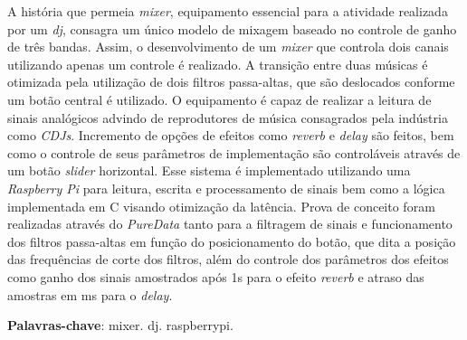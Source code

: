 \begin{resumo}
    A história que permeia \textit{mixer}, equipamento essencial para a atividade realizada por um \textit{dj}, consagra um único modelo de mixagem baseado no controle de ganho de três bandas. Assim, o desenvolvimento de um \textit{mixer} que controla dois canais utilizando apenas um controle é realizado. A transição entre duas músicas é otimizada pela utilização de dois filtros passa-altas, que são deslocados conforme um botão central é utilizado. O equipamento é capaz de realizar a leitura de sinais analógicos advindo de reprodutores de música consagrados pela indústria como \textit{CDJs}. Incremento de opções de efeitos como \textit{reverb} e \textit{delay} são feitos, bem como o controle de seus parâmetros de implementação são controláveis através de um botão \textit{slider} horizontal. Esse sistema é implementado utilizando uma \textit{Raspberry Pi} para leitura, escrita e processamento de sinais bem como a lógica implementada em C visando otimização da latência. Prova de conceito foram realizadas através do \textit{PureData} tanto para a filtragem de sinais e funcionamento dos filtros passa-altas em função do posicionamento do botão, que dita a posição das frequências de corte dos filtros, além do controle dos parâmetros dos efeitos como ganho dos sinais amostrados após 1s para o efeito \textit{reverb} e atraso das amostras em ms para o \textit{delay}.

 \vspace{\onelineskip}
    
 \noindent
 \textbf{Palavras-chave}: mixer. dj. raspberrypi.
\end{resumo}
